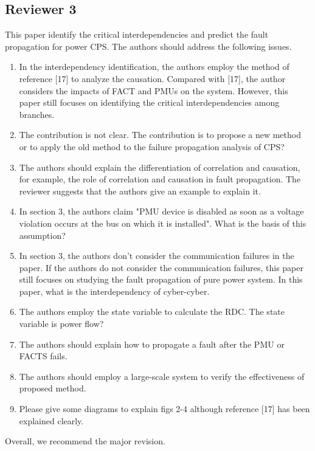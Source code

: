 \documentclass{article}
\begin{document}
\subsection{Reviewer 3}
\label{sec:reviewer:r3}
This paper identify the critical interdependencies and predict the fault propagation for power CPS. The authors should address the following issues.

\begin{enumerate}
  \item In the interdependency identification, the authors employ the method of reference [17] to analyze the causation. Compared with [17], the author considers the impacts of FACT and PMUs on the system. However, this paper still focuses on identifying the critical interdependencies among branches.
  \item The contribution is not clear. The contribution is to propose a new method or to apply the old method to the failure propagation analysis of CPS?
  \item The authors should explain the differentiation of correlation and causation, for example, the role of correlation and causation in fault propagation. The reviewer suggests that the authors give an example to explain it.
  \item In section 3, the authors claim "PMU device is disabled as soon as a voltage violation occurs at the bus on which it is installed". What is the basis of this assumption?
  \item In section 3, the authors don't consider the communication failures in the paper. If the authors do not consider the communication failures, this paper still focuses on studying the fault propagation of pure power system. In this paper, what is the interdependency of cyber-cyber.
  \item The authors employ the state variable to calculate the RDC. The state variable is power flow?
  \item The authors should explain how to propagate a fault after the PMU or FACTS fails.
  \item The authors should employ a large-scale system to verify the effectiveness of proposed method.
  \item Please give some diagrams to explain figs 2-4 although reference [17] has been explained clearly.
\end{enumerate}

Overall, we recommend the major revision.
\end{document}

